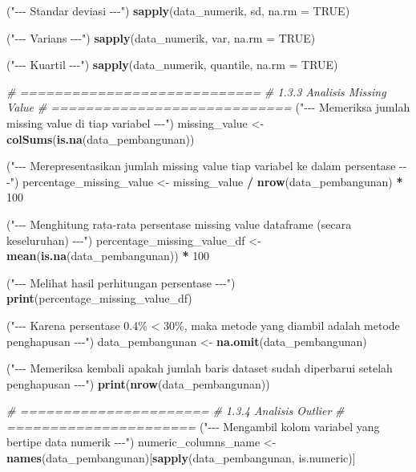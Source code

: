 \documentclass[
  12pt,
]{article}
\newenvironment{Shaded}{\begin{snugshade}}{\end{snugshade}}
\newcommand{\AttributeTok}[1]{\textcolor[rgb]{0.13,0.29,0.53}{#1}}
\newcommand{\CommentTok}[1]{\textcolor[rgb]{0.56,0.35,0.01}{\textit{#1}}}
\newcommand{\ConstantTok}[1]{\textcolor[rgb]{0.56,0.35,0.01}{#1}}
\newcommand{\DecValTok}[1]{\textcolor[rgb]{0.00,0.00,0.81}{#1}}
\newcommand{\FunctionTok}[1]{\textcolor[rgb]{0.13,0.29,0.53}{\textbf{#1}}}
\newcommand{\NormalTok}[1]{#1}
\newcommand{\OtherTok}[1]{\textcolor[rgb]{0.56,0.35,0.01}{#1}}
\newcommand{\SpecialCharTok}[1]{\textcolor[rgb]{0.81,0.36,0.00}{\textbf{#1}}}
\newcommand{\StringTok}[1]{\textcolor[rgb]{0.31,0.60,0.02}{#1}}
\begin{document}
\begin{Shaded}
\begin{Highlighting}[]
\NormalTok{(}\StringTok{"{-}{-}{-} Standar deviasi {-}{-}{-}"}\NormalTok{)}
\FunctionTok{sapply}\NormalTok{(data\_numerik, sd, }\AttributeTok{na.rm =} \ConstantTok{TRUE}\NormalTok{)}

\NormalTok{(}\StringTok{"{-}{-}{-} Varians {-}{-}{-}"}\NormalTok{)}
\FunctionTok{sapply}\NormalTok{(data\_numerik, var, }\AttributeTok{na.rm =} \ConstantTok{TRUE}\NormalTok{)}

\NormalTok{(}\StringTok{"{-}{-}{-} Kuartil {-}{-}{-}"}\NormalTok{)}
\FunctionTok{sapply}\NormalTok{(data\_numerik, quantile, }\AttributeTok{na.rm =} \ConstantTok{TRUE}\NormalTok{)}

\CommentTok{\# ============================}
\CommentTok{\# 1.3.3 Analisis Missing Value}
\CommentTok{\# ============================}
\NormalTok{(}\StringTok{"{-}{-}{-} Memeriksa jumlah missing value di tiap variabel {-}{-}{-}"}\NormalTok{)}
\NormalTok{missing\_value }\OtherTok{\textless{}{-}} \FunctionTok{colSums}\NormalTok{(}\FunctionTok{is.na}\NormalTok{(data\_pembangunan))}

\NormalTok{(}\StringTok{"{-}{-}{-} Merepresentasikan jumlah missing value tiap variabel ke dalam persentase {-}{-}{-}"}\NormalTok{)}
\NormalTok{percentage\_missing\_value }\OtherTok{\textless{}{-}}\NormalTok{ missing\_value }\SpecialCharTok{/} \FunctionTok{nrow}\NormalTok{(data\_pembangunan) }\SpecialCharTok{*} \DecValTok{100}

\NormalTok{(}\StringTok{"{-}{-}{-} Menghitung rata{-}rata persentase missing value dataframe (secara keseluruhan) {-}{-}{-}"}\NormalTok{)}
\NormalTok{percentage\_missing\_value\_df }\OtherTok{\textless{}{-}} \FunctionTok{mean}\NormalTok{(}\FunctionTok{is.na}\NormalTok{(data\_pembangunan)) }\SpecialCharTok{*} \DecValTok{100}

\NormalTok{(}\StringTok{"{-}{-}{-} Melihat hasil perhitungan persentase {-}{-}{-}"}\NormalTok{)}
\FunctionTok{print}\NormalTok{(percentage\_missing\_value\_df)}

\NormalTok{(}\StringTok{"{-}{-}{-} Karena persentase 0.4\% \textless{} 30\%, maka metode yang diambil adalah metode penghapusan {-}{-}{-}"}\NormalTok{)}
\NormalTok{data\_pembangunan }\OtherTok{\textless{}{-}} \FunctionTok{na.omit}\NormalTok{(data\_pembangunan)}

\NormalTok{(}\StringTok{"{-}{-}{-} Memeriksa kembali apakah jumlah baris dataset sudah diperbarui setelah penghapusan {-}{-}{-}"}\NormalTok{)}
\FunctionTok{print}\NormalTok{(}\FunctionTok{nrow}\NormalTok{(data\_pembangunan))}

\CommentTok{\# ======================}
\CommentTok{\# 1.3.4 Analisis Outlier}
\CommentTok{\# ======================}
\NormalTok{(}\StringTok{"{-}{-}{-} Mengambil kolom variabel yang bertipe data numerik {-}{-}{-}"}\NormalTok{)}
\NormalTok{numeric\_columns\_name }\OtherTok{\textless{}{-}} \FunctionTok{names}\NormalTok{(data\_pembangunan)[}\FunctionTok{sapply}\NormalTok{(data\_pembangunan, is.numeric)]}


\end{Highlighting}
\end{Shaded}
\end{document}
